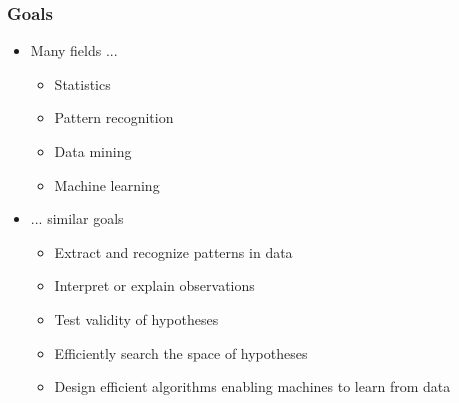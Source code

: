\begin{frame}
  \frametitle{Goals}

  \begin{itemize}
    \item Many fields ...
      \begin{itemize}
        \item Statistics
        \item Pattern recognition
        \item Data mining
        \item Machine learning
      \end{itemize}
    \item ... similar goals
      \begin{itemize}
        \item Extract and recognize patterns in data
        \item Interpret or explain observations
        \item Test validity of hypotheses
        \item Efficiently search the space of hypotheses
        \item Design efficient algorithms enabling machines to learn from data
      \end{itemize}
  \end{itemize}

\end{frame}

